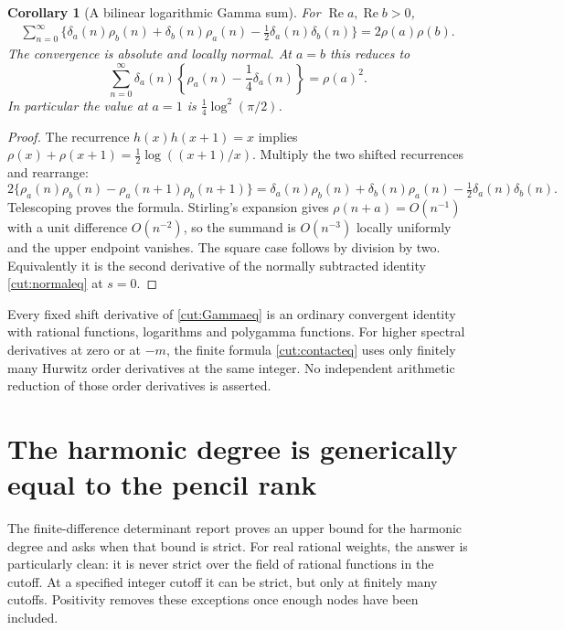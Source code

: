 \documentclass[11pt]{article}
\newtheorem{corollary}[theorem]{Corollary}
\theoremstyle{definition}
\theoremstyle{remark}
\numberwithin{equation}{section}
\newcommand{\Rea}{\operatorname{Re}}
\begin{document}
\begin{corollary}[A bilinear logarithmic Gamma sum]\label{cut:Gamma}
For $\Rea a,\Rea b>0$,
\begin{align}
 \sum_{n=0}^{\infty}\bigl\{
   \delta_a(n)\rho_b(n)+\delta_b(n)\rho_a(n)
        -\tfrac12\delta_a(n)\delta_b(n)\bigr\}
 =2\rho(a)\rho(b).
 \label{cut:Gammaeq}
\end{align}
The convergence is absolute and locally normal. At $a=b$ this reduces to
\begin{equation}\label{cut:Gammasquare}
 \sum_{n=0}^{\infty}\delta_a(n)
       \left\{\rho_a(n)-\frac14\delta_a(n)\right\}=\rho(a)^2.
\end{equation}
In particular the value at $a=1$ is $\tfrac14\log^2(\pi/2)$.
\end{corollary}
\begin{proof}
The recurrence $h(x)h(x+1)=x$ implies
$\rho(x)+\rho(x+1)=\tfrac12\log((x+1)/x)$.
Multiply the two shifted recurrences and rearrange:
\[
 2\{\rho_a(n)\rho_b(n)-\rho_a(n+1)\rho_b(n+1)\}
 =\delta_a(n)\rho_b(n)+\delta_b(n)\rho_a(n)
            -\tfrac12\delta_a(n)\delta_b(n).
\]
Telescoping proves the formula. Stirling's expansion gives
$\rho(n+a)=O(n^{-1})$ with a unit difference $O(n^{-2})$, so the
summand is $O(n^{-3})$ locally uniformly and the upper endpoint vanishes.
The square case follows by division by two. Equivalently it is the
second derivative of the normally subtracted identity
\eqref{cut:normaleq} at $s=0$.
\end{proof}

Every fixed shift derivative of \eqref{cut:Gammaeq} is an ordinary
convergent identity with rational functions, logarithms and polygamma
functions. For higher spectral derivatives at zero or at $-m$, the
finite formula \eqref{cut:contacteq} uses only finitely many Hurwitz
order derivatives at the same integer. No independent arithmetic
reduction of those order derivatives is asserted.


\section{The harmonic degree is generically equal to the pencil rank}
\label{deg:sec}

The finite-difference determinant report proves an upper bound for the
harmonic degree and asks when that bound is strict.  For real rational
weights, the answer is particularly clean: it is never strict over the
field of rational functions in the cutoff.  At a specified integer
cutoff it can be strict, but only at finitely many cutoffs.  Positivity
removes these exceptions once enough nodes have been included.
\end{document}
